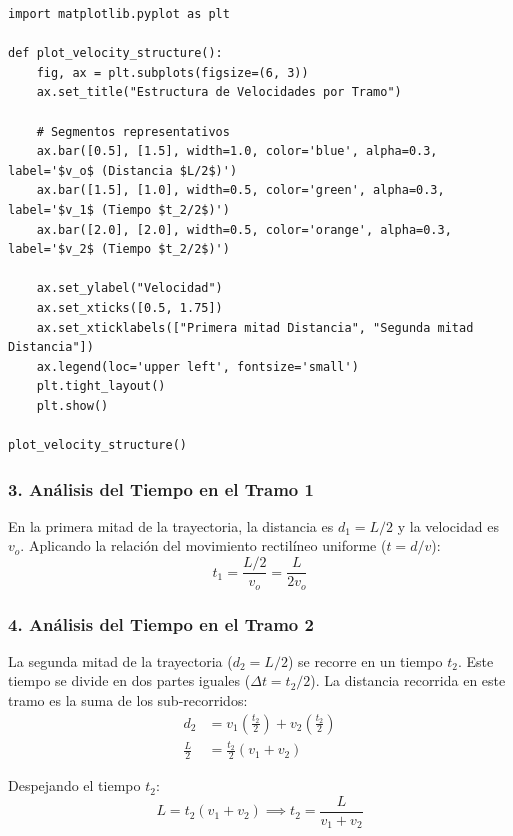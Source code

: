 \documentclass[12pt, a4paper]{article}
\begin{document}
\begin{lstlisting}
import matplotlib.pyplot as plt

def plot_velocity_structure():
    fig, ax = plt.subplots(figsize=(6, 3))
    ax.set_title("Estructura de Velocidades por Tramo")
    
    # Segmentos representativos
    ax.bar([0.5], [1.5], width=1.0, color='blue', alpha=0.3, label='$v_o$ (Distancia $L/2$)')
    ax.bar([1.5], [1.0], width=0.5, color='green', alpha=0.3, label='$v_1$ (Tiempo $t_2/2$)')
    ax.bar([2.0], [2.0], width=0.5, color='orange', alpha=0.3, label='$v_2$ (Tiempo $t_2/2$)')
    
    ax.set_ylabel("Velocidad")
    ax.set_xticks([0.5, 1.75])
    ax.set_xticklabels(["Primera mitad Distancia", "Segunda mitad Distancia"])
    ax.legend(loc='upper left', fontsize='small')
    plt.tight_layout()
    plt.show()

plot_velocity_structure()
\end{lstlisting}

\subsubsection*{3. Análisis del Tiempo en el Tramo 1}

En la primera mitad de la trayectoria, la distancia es $d_1 = L/2$ y la velocidad es $v_o$. Aplicando la relación del movimiento rectilíneo uniforme ($t = d/v$):
\begin{equation}
    t_1 = \frac{L/2}{v_o} = \frac{L}{2v_o}
\end{equation}

\subsubsection*{4. Análisis del Tiempo en el Tramo 2}

La segunda mitad de la trayectoria ($d_2 = L/2$) se recorre en un tiempo $t_2$. Este tiempo se divide en dos partes iguales ($\Delta t = t_2/2$). La distancia recorrida en este tramo es la suma de los sub-recorridos:
\begin{align*}
    d_2 &= v_1 \left(\frac{t_2}{2}\right) + v_2 \left(\frac{t_2}{2}\right) \\
    \frac{L}{2} &= \frac{t_2}{2} (v_1 + v_2)
\end{align*}

Despejando el tiempo $t_2$:
\begin{equation}
    L = t_2 (v_1 + v_2) \implies t_2 = \frac{L}{v_1 + v_2}
\end{equation}
\end{document}
